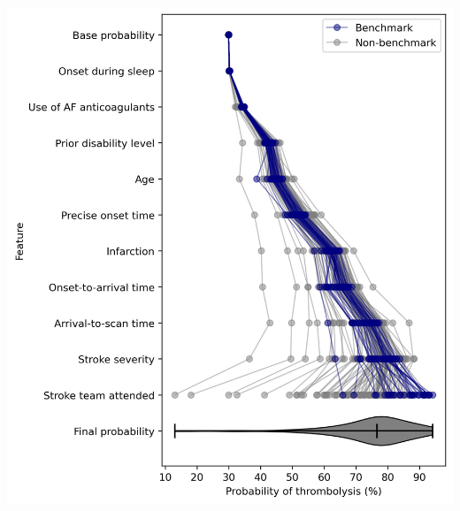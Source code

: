 \documentclass{beamer}
\begin{document}
\begin{frame}
\begin{columns}
    \begin{column}{0.55\textwidth}
        \begin{center}
        \includegraphics[width=1.0\textwidth]{./images/shap_waterfall_with_violin.jpg}
        \end{center}
    \end{column}
    
\end{columns}

\end{frame}
\end{document}
